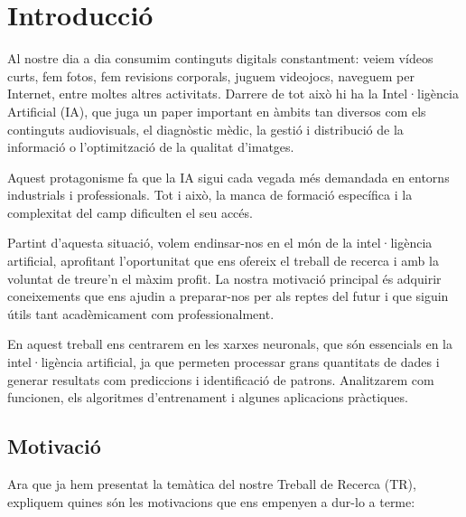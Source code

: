 \chapter{Introducció}
\label{c:intro}
Al nostre dia a dia consumim continguts digitals constantment: veiem vídeos curts, fem fotos, fem revisions corporals, juguem videojocs, naveguem per Internet, entre moltes altres activitats. Darrere de tot això hi ha la Intel·ligència Artificial (IA), que juga un paper important en àmbits tan diversos com els continguts audiovisuals, el diagnòstic mèdic, la gestió i distribució de la informació o l’optimització de la qualitat d’imatges.

Aquest protagonisme fa que la IA sigui cada vegada més demandada en entorns industrials i professionals. Tot i això, la manca de formació específica i la complexitat del camp dificulten el seu accés.

Partint d’aquesta situació, volem endinsar-nos en el món de la intel·ligència artificial, aprofitant l’oportunitat que ens ofereix el treball de recerca i amb la voluntat de treure’n el màxim profit. La nostra motivació principal és adquirir coneixements que ens ajudin a preparar-nos per als reptes del futur i que siguin útils tant acadèmicament com professionalment.

En aquest treball ens centrarem en les xarxes neuronals, que són essencials en la intel·ligència artificial, ja que permeten processar grans quantitats de dades i generar resultats com prediccions i identificació de patrons. Analitzarem com funcionen, els algoritmes d’entrenament i algunes aplicacions pràctiques.



\section{Motivació}
Ara que ja hem presentat la temàtica del nostre Treball de Recerca (TR), expliquem quines són les motivacions que ens empenyen a dur-lo a terme:

